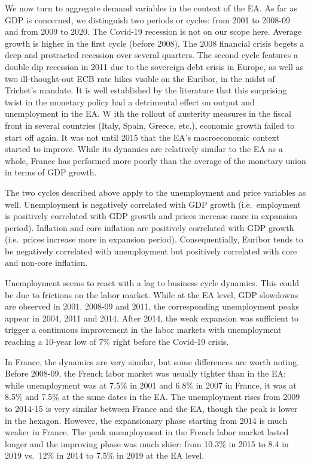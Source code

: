 \documentclass[
  11pt,
]{article}
\begin{document}
We now turn to aggregate demand variables in the context of the EA.
As far as GDP is concerned, we distinguish two periods or cycles: from 2001 to 2008-09 and from 2009 to 2020.
The Covid-19 recession is not on our scope here. Average growth is higher in the first cycle (before 2008).
The 2008 financial crisis begets a deep and protracted recession over several quarters.
The second cycle features a double dip recession in 2011 due to the sovereign debt crisis in Europe, as well as two ill-thought-out ECB rate hikes visible on the Euribor, in the midst of Trichet's mandate.
It is well established by the literature that this surprising twist in the monetary policy had a detrimental effect on output and unemployment in the EA. W
ith the rollout of austerity measures in the fiscal front in several countries (Italy, Spain, Greece, etc.), economic growth failed to start off again. It was not until 2015 that the EA's macroeconomic context started to improve.
While its dynamics are relatively similar to the EA as a whole, France has performed more poorly than the average of the monetary union in terms of GDP growth.

The two cycles described above apply to the unemployment and price variables as well.
Unemployment is negatively correlated with GDP growth (i.e.~employment is positively correlated with GDP growth and prices increase more in expansion period). Inflation and core inflation are positively correlated with GDP growth (i.e.~prices increase more in expansion period).
Consequentially, Euribor tends to be negatively correlated with unemployment but positively correlated with core and non-core inflation.

Unemployment seems to react with a lag to business cycle dynamics.
This could be due to frictions on the labor market. While at the EA level, GDP slowdowns are observed in 2001, 2008-09 and 2011, the corresponding unemployment peaks appear in 2004, 2011 and 2014.
After 2014, the weak expansion was sufficient to trigger a continuous improvement in the labor markets with unemployment reaching a 10-year low of 7\% right before the Covid-19 crisis.

In France, the dynamics are very similar, but some differences are worth noting. Before 2008-09, the French labor market was usually tighter than in the EA: while unemployment was at 7.5\% in 2001 and 6.8\% in 2007 in France, it was at 8.5\% and 7.5\% at the same dates in the EA. The unemployment rises from 2009 to 2014-15 is very similar between France and the EA, though the peak is lower in the hexagon. However, the expansionary phase starting from 2014 is much weaker in France. The peak unemployment in the French labor market lasted longer and the improving phase was much shier: from 10.3\% in 2015 to 8.4 in 2019 vs.~12\% in 2014 to 7.5\% in 2019 at the EA level.
\end{document}

